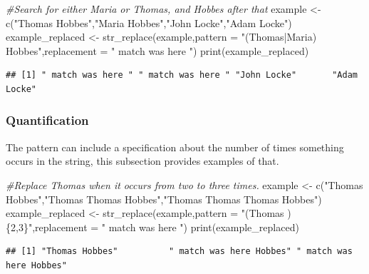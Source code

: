 \documentclass[
]{book}
\newenvironment{Shaded}{\begin{snugshade}}{\end{snugshade}}
\newcommand{\AttributeTok}[1]{\textcolor[rgb]{0.77,0.63,0.00}{#1}}
\newcommand{\CommentTok}[1]{\textcolor[rgb]{0.56,0.35,0.01}{\textit{#1}}}
\newcommand{\FunctionTok}[1]{\textcolor[rgb]{0.00,0.00,0.00}{#1}}
\newcommand{\NormalTok}[1]{#1}
\newcommand{\OtherTok}[1]{\textcolor[rgb]{0.56,0.35,0.01}{#1}}
\newcommand{\StringTok}[1]{\textcolor[rgb]{0.31,0.60,0.02}{#1}}
\begin{document}
\begin{Shaded}
\begin{Highlighting}[]
\CommentTok{\#Search for either Maria or Thomas, and Hobbes after that}
\NormalTok{example }\OtherTok{\textless{}{-}} \FunctionTok{c}\NormalTok{(}\StringTok{"Thomas Hobbes"}\NormalTok{,}\StringTok{"Maria Hobbes"}\NormalTok{,}\StringTok{"John Locke"}\NormalTok{,}\StringTok{"Adam Locke"}\NormalTok{)}
\NormalTok{example\_replaced }\OtherTok{\textless{}{-}} \FunctionTok{str\_replace}\NormalTok{(example,}\AttributeTok{pattern =} \StringTok{"(Thomas|Maria) Hobbes"}\NormalTok{,}\AttributeTok{replacement =} \StringTok{" match was here "}\NormalTok{)}
\FunctionTok{print}\NormalTok{(example\_replaced)}
\end{Highlighting}
\end{Shaded}

\begin{verbatim}
## [1] " match was here " " match was here " "John Locke"       "Adam Locke"
\end{verbatim}

\hypertarget{quantification}{%
\subsubsection{Quantification}\label{quantification}}

The pattern can include a specification about the number of times something occurs in the string, this
subsection provides examples of that.

\begin{Shaded}
\begin{Highlighting}[]
\CommentTok{\#Replace Thomas when it occurs from two to three times.}
\NormalTok{example }\OtherTok{\textless{}{-}} \FunctionTok{c}\NormalTok{(}\StringTok{"Thomas Hobbes"}\NormalTok{,}\StringTok{"Thomas Thomas Hobbes"}\NormalTok{,}\StringTok{"Thomas Thomas Thomas Hobbes"}\NormalTok{)}
\NormalTok{example\_replaced }\OtherTok{\textless{}{-}} \FunctionTok{str\_replace}\NormalTok{(example,}\AttributeTok{pattern =} \StringTok{"(Thomas )\{2,3\}"}\NormalTok{,}\AttributeTok{replacement =} \StringTok{" match was here "}\NormalTok{)}
\FunctionTok{print}\NormalTok{(example\_replaced)}
\end{Highlighting}
\end{Shaded}

\begin{verbatim}
## [1] "Thomas Hobbes"          " match was here Hobbes" " match was here Hobbes"
\end{verbatim}
\end{document}
